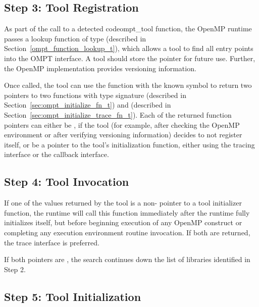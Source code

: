 \subsection{Step 3: Tool Registration}
\label{sec:ToolsSupport_Registration}

As part of the call to a detected code{ompt\_tool} function, the OpenMP runtime passes
a lookup function of type  (described in Section~\ref{ompt_function_lookup_t}),
which allows a tool to find all entry points into the OMPT interface. A tool should store the pointer for
future use. Further, the OpenMP implementation provides versioning information.

Once called, the tool can use the function with the known symbol   to
return two pointers to two functions with type signature 
 (described in  Section~\ref{sec:ompt_initialize_fn_t}) and
 (described in  Section~\ref{sec:ompt_initialize_trace_fn_t}).
Each of the returned function pointers
can either be , if the tool (for example, after checking the OpenMP environment
or after verifying versioning information) 
decides to not register itself, or be a pointer to the tool's initialization function, either using 
the tracing interface or the callback interface.

\subsection{Step 4: Tool Invocation}
\label{sec:tool-invocation}

If one of the values returned by the tool is a non- pointer to a tool initializer function, 
the runtime will call this function immediately after the runtime fully initializes itself, but
before beginning execution of any OpenMP construct or completing any execution 
environment routine invocation. If both are returned, the trace interface is preferred.

If both pointers are , the search continues down the list of libraries identified in Step 2.

\subsection{Step 5: Tool Initialization}
\label{sec:tool-initialize}

